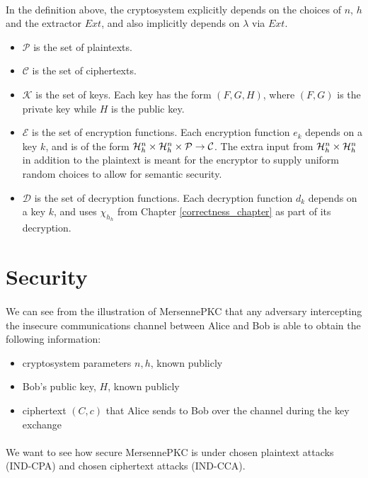 \paragraph{}
In the definition above, the cryptosystem explicitly depends on the choices of $n$, $h$ and the extractor $Ext$, and also implicitly depends on $\lambda$ via $Ext$.
\begin{itemize}
    \item $\mathcal{P}$ is the set of plaintexts.
    \item $\mathcal{C}$ is the set of ciphertexts.
    \item $\mathcal{K}$ is the set of keys. Each key has the form $(F, G, H)$, where $(F, G)$ is the private key while $H$ is the public key.
    \item $\mathcal{E}$ is the set of encryption functions. Each encryption function $e_k$ depends on a key $k$, and is of the form $\mathcal{H}_h^n \times \mathcal{H}_h^n \times \mathcal{P} \rightarrow \mathcal{C}$. The extra input from $\mathcal{H}_h^n \times \mathcal{H}_h^n$ in addition to the plaintext is meant for the encryptor to supply uniform random choices to allow for semantic security.
    \item $\mathcal{D}$ is the set of decryption functions. Each decryption function $d_k$ depends on a key $k$, and uses $\chi_{h_h}$ from Chapter \ref{correctness_chapter} as part of its decryption.
\end{itemize}

\section{Security}

\paragraph{}
We can see from the illustration of MersennePKC that any adversary intercepting the insecure communications channel between Alice and Bob is able to obtain the following information:
\begin{itemize}
    \item cryptosystem parameters $n, h$, known publicly
    \item Bob's public key, $H$, known publicly
    \item ciphertext $(C, c)$ that Alice sends to Bob over the channel during the key exchange
\end{itemize}

\paragraph{}
We want to see how secure MersennePKC is under chosen plaintext attacks (IND-CPA) and chosen ciphertext attacks (IND-CCA).

